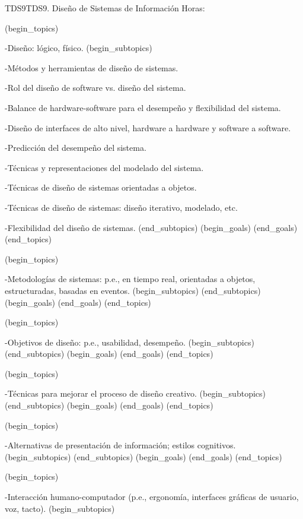 \begin{BKL2}{TDS9}{TDS9. Diseño de Sistemas de Información}
Horas:
 
(begin_topics)

-Diseño: lógico, físico.
(begin_subtopics)

-Métodos y herramientas de diseño de sistemas.

-Rol del diseño de software vs. diseño del sistema.

-Balance de hardware-software para el desempeño y flexibilidad del sistema.

-Diseño de interfaces de alto nivel, hardware a hardware y software a software.

-Predicción del desempeño del sistema.

-Técnicas y representaciones del modelado del sistema.

-Técnicas de diseño de sistemas orientadas a objetos.

-Técnicas de diseño de sistemas: diseño iterativo, modelado, etc.

-Flexibilidad del diseño de sistemas.
(end_subtopics)
(begin_goals)
(end_goals)
(end_topics)

 

(begin_topics)

-Metodologías de sistemas: p.e., en tiempo real, orientadas a objetos, estructuradas, basadas en eventos.
(begin_subtopics)
(end_subtopics)
(begin_goals)
(end_goals)
(end_topics)

 

(begin_topics)

-Objetivos de diseño: p.e., usabilidad, desempeño.
(begin_subtopics)
(end_subtopics)
(begin_goals)
(end_goals)
(end_topics)

 

(begin_topics)

-Técnicas para mejorar el proceso de diseño creativo.
(begin_subtopics)
(end_subtopics)
(begin_goals)
(end_goals)
(end_topics)

 

(begin_topics)

-Alternativas de presentación de información; estilos cognitivos.
(begin_subtopics)
(end_subtopics)
(begin_goals)
(end_goals)
(end_topics)

 

(begin_topics)

-Interacción humano-computador (p.e., ergonomía, interfaces gráficas de usuario, voz, tacto).
(begin_subtopics)


\end{BKL2}

